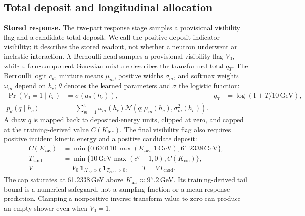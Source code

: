 \documentclass[10pt]{article}
\newcommand{\GeV}{\,\mathrm{GeV}}
\newcommand{\Kinc}{K_{\mathrm{inc}}}
\begin{document}
\subsection{Total deposit and longitudinal allocation}

\textbf{Stored response.} The two-part response stage samples a provisional visibility flag and a candidate total deposit. We call the positive-deposit indicator visibility; it describes the stored readout, not whether a neutron underwent an inelastic interaction. A Bernoulli head samples a provisional visibility flag $V_0$, while a four-component Gaussian mixture describes the transformed total $q_T$. The Bernoulli logit $a_\theta$, mixture means $\mu_m$, positive widths $\sigma_m$, and softmax weights $\omega_m$ depend on $h_c$; $\theta$ denotes the learned parameters and $\sigma$ the logistic function:
\begin{equation}
 \begin{aligned}
 \Pr(V_0=1\mid h_c)&=\sigma(a_\theta(h_c)),
 &q_T&=\log(1+T/10\GeV),\\
 p_\theta(q\mid h_c)&=\sum_{m=1}^{4}\omega_m(h_c)
 \mathcal N\!\left(q;\mu_m(h_c),\sigma_m^2(h_c)\right).
 \end{aligned}
 \label{eq:response_transform}
\end{equation}
A draw $q$ is mapped back to deposited-energy units, clipped at zero, and capped at the training-derived value $C(\Kinc)$. The final visibility flag also requires positive incident kinetic energy and a positive candidate deposit:
\begin{equation}
 \begin{aligned}
 C(\Kinc)&=\min\{0.630110\max(\Kinc,1\GeV),61.2338\GeV\},\\
 T_{\mathrm{cand}}&=\min\{10\GeV\max(e^q-1,0),C(\Kinc)\},\\
 V&=V_0\,\mathbf 1_{\Kinc>0}\,\mathbf 1_{T_{\mathrm{cand}}>0},
 \qquad T=VT_{\mathrm{cand}}.
 \end{aligned}
 \label{eq:cap}
\end{equation}
The cap saturates at 61.2338\,GeV above $\Kinc\approx97.2\GeV$. Its training-derived tail bound is a numerical safeguard, not a sampling fraction or a mean-response prediction. Clamping a nonpositive inverse-transform value to zero can produce an empty shower even when $V_0=1$.
\end{document}
